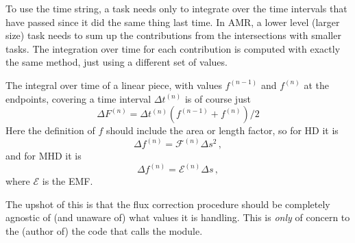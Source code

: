 \documentclass[paper=a4,fontsize=11pt]{scrartcl}
\numberwithin{equation}{section}		%
\numberwithin{figure}{section}			%
\numberwithin{table}{section}				%
\begin{document}
To use the time string, a task needs only to integrate over the time intervals that have passed since it did the same thing last time. In AMR, a lower level (larger size) task needs to sum up the contributions from the intersections with smaller tasks.  The integration over time for each contribution is computed with exactly the same method, just using a different set of values.

The integral over time of a linear piece, with values $f^{(n-1)}$ and $f^{(n)}$ at the endpoints, covering a time interval $\Delta t^{(n)}$ is of course just
\begin{equation}
    \Delta F^{(n)} = \Delta t^{(n)} (f^{(n-1)}+ f^{(n)})/2
\end{equation}
Here the definition of $f$ should include the area or length factor, so for HD it is
\begin{equation}
    \Delta f^{(n)} = \mathcal{F}^{(n)} \Delta s^2 \,,
\end{equation}
and for MHD it is
\begin{equation}
    \Delta f^{(n)} = \mathcal{E}^{(n)} \Delta s \,,
\end{equation}
where $\mathcal{E}$ is the EMF.

The upshot of this is that the flux correction procedure should be completely agnostic of (and unaware of) what values it is handling.  This is \textit{only} of concern to the (author of) the code that calls the module.
\end{document}
